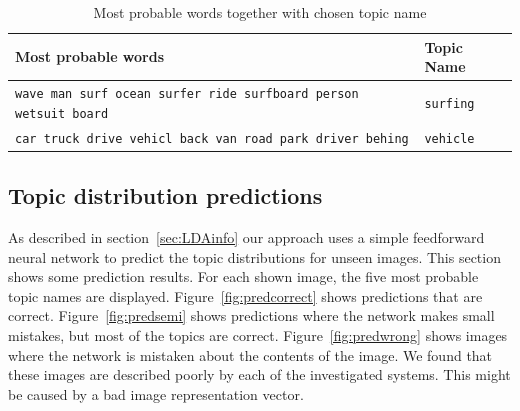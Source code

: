 \documentclass[twoside,twocolumn]{article}
\begin{document}
\begin{table}[!t]
	\centering
	\begin{tabular}{ll}
		Most probable words                                               & Topic Name \\ \hline
		\texttt{\small{wave man surf ocean surfer ride surfboard person wetsuit board}} & \texttt{surfing}       \\
		\texttt{\small{car truck drive vehicl back van road park driver behing}}        & \texttt{vehicle}      \\
	\end{tabular}
	\caption{Most probable words together with chosen topic name}	\label{tbl:woorden-naar-topic}
\end{table}

\subsection{Topic distribution predictions}
As described in section~\ref{sec:LDAinfo} our approach uses a simple feedforward neural network to predict the topic distributions for unseen images. This section shows some prediction results. For each shown image, the five most probable topic names are displayed. Figure~\ref{fig:predcorrect} shows predictions that are correct. Figure~\ref{fig:predsemi} shows predictions where the network makes small mistakes, but most of the topics are correct. Figure~\ref{fig:predwrong} shows images where the network is mistaken about the contents of the image. We found that these images are described poorly by each of the investigated systems. This might be caused by a bad image representation vector.
\end{document}
